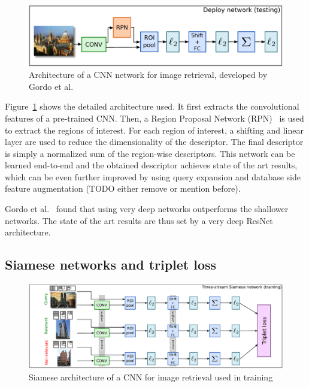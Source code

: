 \begin{figure}
\includegraphics[width=\textwidth]{img/gordo_deepimageretrievaldeploy.png}
\caption{Architecture of a CNN network for image retrieval, developed by
Gordo et al.~\cite{gordo_deep_2016}
\label{fig:gordo_deploy}}
\end{figure}
Figure~\ref{fig:gordo_deploy} shows the detailed architecture used.
It first extracts the convolutional features of a pre-trained
CNN. Then, a Region Proposal Network (RPN)~\cite{ren_faster_2015} is
used to extract the regions of interest. For each region of interest,
a shifting and linear layer are used to reduce the dimensionality of
the descriptor. The final descriptor is simply a normalized sum of the
region-wise descriptors. This network can be learned end-to-end and
the obtained descriptor achieves state of the art results, which can
be even further improved by using query expansion and database side
feature augmentation (TODO either remove or mention before).

Gordo et al.~\cite{gordo_deep_2016} found that using very deep networks
outperforms the shallower networks. The state of the art results are
thus set by a very deep ResNet architecture.

\subsection{Siamese networks and triplet loss}
\begin{figure}
\includegraphics[width=\textwidth]{img/gordo_deepimageretrievalarc.png}
\caption{Siamese architecture of a CNN for image retrieval used in
training~\cite{gordo_deep_2016}
\label{fig:gordo_train}}
\end{figure}


